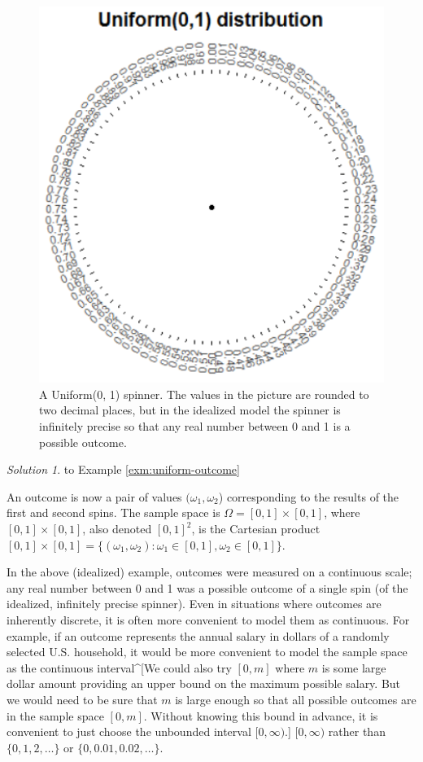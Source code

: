 \documentclass[
]{book}
\theoremstyle{definition}
\theoremstyle{definition}
\theoremstyle{definition}
\theoremstyle{remark}
\newtheorem*{solution}{Solution}
\begin{document}
\begin{figure}
\includegraphics[width=5.69in]{_graphics/uniform-spinner} \caption{A Uniform(0, 1) spinner. The values in the picture are rounded to two decimal places, but in the idealized model the spinner is infinitely precise so that any real number between 0 and 1 is a possible outcome.}\label{fig:uniform-spinner}
\end{figure}

\begin{solution}
{}
to Example \ref{exm:uniform-outcome}
\end{solution}

An outcome is now a pair of values \((\omega_1, \omega_2\)) corresponding to the results of the first and second spins. The sample space is \(\Omega = [0,1]\times [0,1]\), where \([0,1]\times [0,1]\), also denoted \([0,1]^2\), is the Cartesian product \([0,1]\times [0,1] = \{(\omega_1, \omega_2): \omega_1 \in [0, 1], \omega_2 \in [0, 1]\}\).

In the above (idealized) example, outcomes were measured on a continuous scale; any real number between 0 and 1 was a possible outcome of a single spin (of the idealized, infinitely precise spinner). Even in situations where outcomes are inherently discrete, it is often more convenient to model them as continuous. For example, if an outcome represents the annual salary in dollars of a randomly selected U.S. household, it would be more convenient to model the sample space as the continuous interval\^{}{[}We could also try \([0, m]\) where \(m\) is some large dollar amount providing an upper bound on the maximum possible salary. But we would need to be sure that \(m\) is large enough so that all possible outcomes are in the sample space \([0, m]\). Without knowing this bound in advance, it is convenient to just choose the unbounded interval \([0, \infty)\).{]} \([0, \infty)\) rather than \(\{0, 1, 2, \ldots\}\) or \(\{0, 0.01, 0.02, \ldots\}\).
\end{document}
